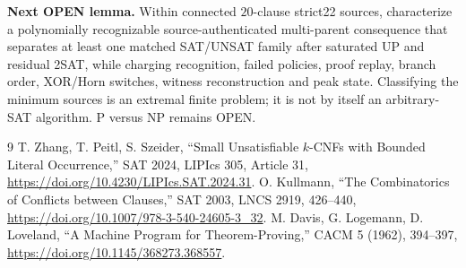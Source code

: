 \documentclass[10pt]{article}
\begin{document}
\noindent\textbf{Next OPEN lemma.}  Within connected $20$-clause strict22
sources, characterize a polynomially recognizable source-authenticated
multi-parent consequence that separates at least one matched SAT/UNSAT family
after saturated UP and residual 2SAT, while charging recognition, failed
policies, proof replay, branch order, XOR/Horn switches, witness reconstruction
and peak state.  Classifying the minimum sources is an extremal finite problem;
it is not by itself an arbitrary-SAT algorithm.  P versus NP remains OPEN.

\begin{thebibliography}{9}\small
{} T. Zhang, T. Peitl, S. Szeider,
``Small Unsatisfiable $k$-CNFs with Bounded Literal Occurrence,''
SAT 2024, LIPIcs 305, Article 31,
\url{https://doi.org/10.4230/LIPIcs.SAT.2024.31}.
 O. Kullmann, ``The Combinatorics of Conflicts between
Clauses,'' SAT 2003, LNCS 2919, 426--440,
\url{https://doi.org/10.1007/978-3-540-24605-3_32}.
 M. Davis, G. Logemann, D. Loveland, ``A Machine Program for
Theorem-Proving,'' CACM 5 (1962), 394--397,
\url{https://doi.org/10.1145/368273.368557}.
\end{thebibliography}
\end{document}
